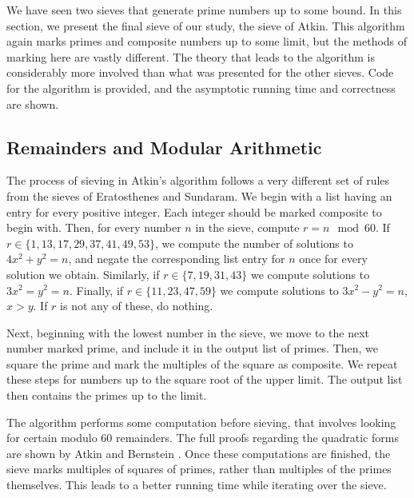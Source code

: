 \documentclass{amsart}
\theoremstyle{definition}
\theoremstyle{case}
\begin{document}
	We have seen two sieves that generate prime numbers up to some bound. In this section, we present the final sieve of our study, the sieve of Atkin. This algorithm again marks primes and composite numbers up to some limit, but the methods of marking here are vastly different. The theory that leads to the algorithm is considerably more involved than what was presented for the other sieves. Code for the algorithm is provided, and the asymptotic running time and correctness are shown.
	
	\subsection{Remainders and Modular Arithmetic}
	
	The process of sieving in Atkin's algorithm follows a very different set of rules from the sieves of Eratosthenes and Sundaram. We begin with a list having an entry for every positive integer. Each integer should be marked composite to begin with. Then, for every number $n$ in the sieve, compute $r = n \mod 60$. If $r \in \{1, 13, 17, 29, 37, 41, 49, 53\}$, we compute the number of solutions to $4x^2 + y^2 = n$, and negate the corresponding list entry for $n$ once for every solution we obtain. Similarly, if $r \in \{7, 19, 31, 43\}$ we compute solutions to $3x^2 = y^2 = n$. Finally, if $r \in \{11, 23, 47, 59\}$ we compute solutions to $3x^2 - y^2 = n$, $x>y$. If $r$ is not any of these, do nothing.
	
	Next, beginning with the lowest number in the sieve, we move to the next number marked prime, and include it in the output list of primes. Then, we square the prime and mark the multiples of the square as composite. We repeat these steps for numbers up to the square root of the upper limit. The output list then contains the primes up to the limit.
	
	The algorithm performs some computation before sieving, that involves looking for certain modulo 60 remainders. The full proofs regarding the quadratic forms are shown by Atkin and Bernstein \cite[p.~1028]{MR2031423}. Once these computations are finished, the sieve marks multiples of squares of primes, rather than multiples of the primes themselves. This leads to a better running time while iterating over the sieve.
	
\end{document}

